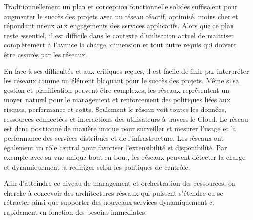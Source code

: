 
Traditionnellement un plan et conception fonctionnelle solides suffisaient pour augmenter le succès des projets avec un réseau réactif, optimisé, moins cher et répondant mieux aux engagements des services applicatifs. Alors que ce plan reste essentiel, il est difficile dans le contexte d'utilisation actuel de maitriser complètement  à l'avance la charge, dimension et tout autre requis qui doivent être assurés par les réseaux.

En face à ses difficultés et aux critiques reçues, il est facile  de finir par interpréter les réseaux comme un élément bloquant pour le succès des projets. Même si sa gestion et planification peuvent être complexes, les réseaux représentent un moyen naturel pour le management et renforcement des politiques liées aux risques, performance et coûts. Seulement le réseau voit toutes les données, ressources connectées et interactions des utilisateurs à travers le Cloud. Le réseau est donc positionné de manière unique pour surveiller et mesurer l'usage et la performance des services distribués et de l'infrastructure. Les réseaux ont également un rôle central pour favoriser l'extensibilité et disponibilité. Par exemple avec sa vue unique bout-en-bout, les réseaux peuvent détecter la charge et dynamiquement la rediriger selon les politiques de contrôle.

Afin d'atteindre ce niveau de management et orchestration des ressources, on cherche  à concevoir des architectures réseaux qui puissent s'étendre ou se rétracter ainsi que supporter des nouveaux services dynamiquement et rapidement  en fonction des besoins immédiates. \cite{ibmPlanningVirtCCchap4}


